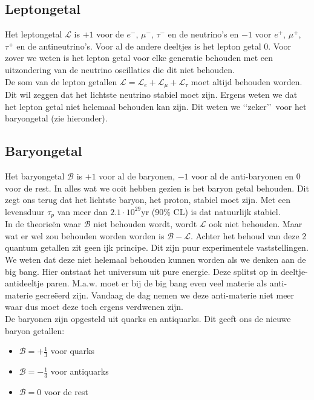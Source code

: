 \documentclass[../main.tex]{subfiles}
\begin{document}
\subsection{Leptongetal}%
\label{sub:lepton_getal}

Het leptongetal $\mathcal{L}$ is $+1$ voor de $e^-$, $\mu^-$, $\tau^-$ en de neutrino's en $-1$ voor $e^+$, $\mu^+$, $\tau^+$ en de antineutrino's. Voor al de andere deeltjes is het lepton getal $0$. Voor zover we weten is het lepton getal voor elke generatie behouden met een uitzondering van de neutrino oscillaties die dit niet behouden.\\
De som van de lepton getallen $\mathcal{L} = \mathcal{L}_e + \mathcal{L}_\mu + \mathcal{L}_\tau$ moet altijd behouden worden. Dit wil zeggen dat het lichtste neutrino stabiel moet zijn. Ergens weten we dat het lepton getal niet helemaal behouden kan zijn. Dit weten we \lq\lq zeker\rq\rq\  voor het baryongetal (zie hieronder).

\subsection{Baryongetal}%
\label{sub:baryon_getal}

Het baryongetal $\mathcal{B}$ is $+1$ voor al de baryonen, $-1$ voor al de anti-baryonen en $0$ voor de rest. In alles wat we ooit hebben gezien is het baryon getal behouden. Dit zegt ons terug dat het lichtste baryon, het proton, stabiel moet zijn. Met een levensduur  $\tau_p$ van meer dan $2.1\cdot 10^{29}$yr (90\% CL) is dat natuurlijk stabiel.\\
In de theorieën waar $\mathcal{B}$ niet behouden wordt, wordt $\mathcal{L}$ ook niet behouden. Maar wat er wel zou behouden worden worden is $\mathcal{B-L}$. Achter het behoud van deze 2 quantum getallen zit geen ijk principe. Dit zijn puur experimentele vaststellingen.  We weten dat deze niet helemaal behouden kunnen worden als we denken aan de big bang. Hier ontstaat het universum uit pure energie. Deze splitst op in deeltje-antideeltje paren. M.a.w. moet er bij de big bang even veel materie als anti-materie gecreëerd zijn. Vandaag de dag nemen we deze anti-materie niet meer waar dus moet deze toch ergens verdwenen zijn.\\
De baryonen zijn opgesteld uit quarks en antiquarks. Dit geeft ons de nieuwe baryon getallen:
\begin{itemize}
    \item $\mathcal{B} = +\frac{1}{3}$ voor quarks
    \item $\mathcal{B} = -\frac{1}{3}$ voor antiquarks
    \item $\mathcal{B} = 0$ voor de rest
\end{itemize}
\end{document}
